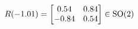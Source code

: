 \documentclass[preview]{standalone}
\begin{document}
\begin{align*}
\special{dvisvgm:raw <g id='unique000'>}R(-1.01) = \begin{bmatrix} 0.54 & 0.84 \\ -0.84 & 0.54 \end{bmatrix} \in \text{SO}(2)\special{dvisvgm:raw </g>}
\end{align*}
\end{document}
